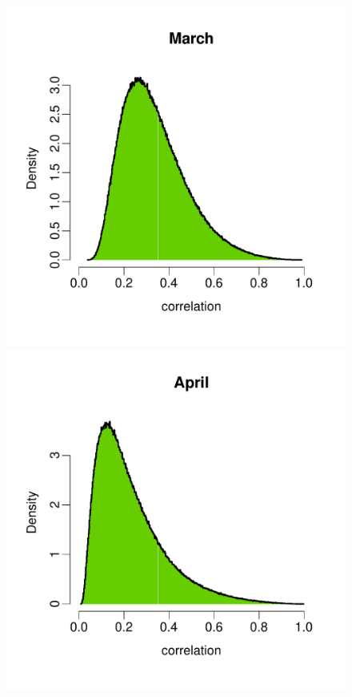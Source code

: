 \documentclass[a4paper, 12pt]{article}
\begin{document}
\begin{figure}
 \includegraphics[width=\scale]{Validation_Plots/Correlation/Correlation_03_Mar}\\[-3ex]
 \includegraphics[width=\scale]{Validation_Plots/Correlation/Correlation_04_Apr}\hspace{-1ex}

\end{figure}
\end{document}
